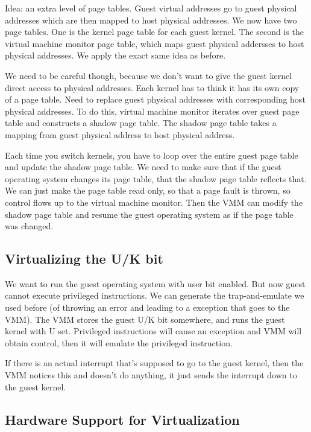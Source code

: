 \documentclass[psamsfonts]{amsart}
\begin{document}
Idea: an extra level of page tables. Guest virtual addresses go to guest physical addresses which are then mapped to host physical addresses. We now have two page tables. One is the kernel page table for each guest kernel. The second is the virtual machine monitor page table, which maps guest physical addersses to host physical addresses. We apply the exact same idea as before.

We need to be careful though, because we don't want to give the guest kernel direct access to physical addresses. Each kernel has to think it has its own copy of a page table. Need to replace guest physical addresses with corresponding host physical addresses. To do this, virtual machine monitor iterates over guest page table and constructs a shadow page table. The shadow page table takes a mapping from guest physical address to host physical address.

Each time you switch kernels, you have to loop over the entire guest page table and update the shadow page table. We need to make sure that if the guest operating system changes its page table, that the shadow page table reflects that. We can just make the page table read only, so that a page fault is thrown, so control flows up to the virtual machine monitor. Then the VMM can modify the shadow page table and resume the guest operating system as if the page table was changed.

\subsection{Virtualizing the U/K bit}

We want to run the guest operating system with user bit enabled. But now guest cannot execute privileged instructions. We can generate the trap-and-emulate we used before (of throwing an error and leading to a exception that goes to the VMM). The VMM stores the guest U/K bit somewhere, and runs the guest kernel with U set. Privileged instructions will cause an exception and VMM will obtain control, then it will emulate the privileged instruction.

If there is an actual interrupt that's supposed to go to the guest kernel, then the VMM notices this and doesn't do anything, it just sends the interrupt down to the guest kernel.

\subsection{Hardware Support for Virtualization}
\end{document}
